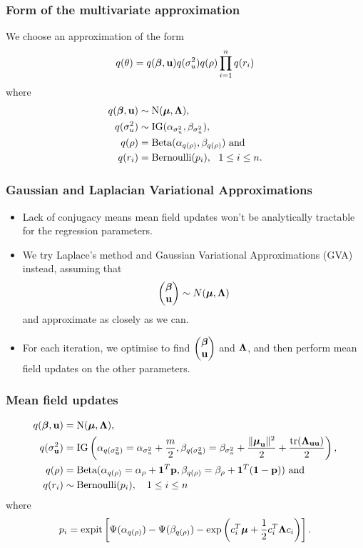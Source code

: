 \documentclass{beamer}
\begin{document}
\begin{frame}
\frametitle{Form of the multivariate approximation}
We choose an approximation of the form
$$
q(\theta) = q({\boldsymbol \beta}, {\bf u}) q(\sigma_u^2) q(\rho) \prod_{i=1}^n q(r_i)
$$
where
\begin{align*}
q({\boldsymbol \beta}, {\bf u}) &\sim \text{N}({\boldsymbol \mu}, {\boldsymbol \Lambda}), \\
q(\sigma_u^2) &\sim \text{IG}(\alpha_{\sigma_u^2}, \beta_{\sigma_u^2}), \\
q(\rho) &= \text{Beta}(\alpha_{q(\rho)}, \beta_{q(\rho)}) \text{ and} \\
q(r_i) &= \text{Bernoulli}(p_i), \ \ 1 \leq i \leq n.
\end{align*}
\end{frame}

\begin{frame}
\frametitle{Gaussian and Laplacian Variational Approximations}
\begin{itemize}
\item Lack of conjugacy means mean field updates won't be analytically tractable for the regression parameters.
\item We try Laplace's method and Gaussian Variational Approximations (GVA) instead, assuming that
$$
\begin{pmatrix}
{\boldsymbol\beta} \\
{\bf u}
\end{pmatrix}
\sim N({\boldsymbol \mu}, {\boldsymbol \Lambda})
$$
and approximate as closely as we can.
\item For each iteration, we optimise to find
$\begin{pmatrix}
{\boldsymbol\beta} \\
{\bf u}
\end{pmatrix}
$ and ${\boldsymbol \Lambda}$,
and then perform mean field updates on the other parameters.
\end{itemize}
\end{frame}

\begin{frame}
\frametitle{Mean field updates}
\begin{align*}
q({\boldsymbol \beta}, {\bf u}) &= \text{N}({\boldsymbol \mu}, {\boldsymbol \Lambda}), \\
q(\sigma_{{\bf u}}^2) &= \text{IG}\left(\alpha_{q(\sigma_{{\bf u}}^2)} = \alpha_{\sigma_u^2} + \frac{m}{2}, \beta_{q(\sigma_{{\bf u}}^2)} = \beta_{\sigma_u^2} + \frac{\|{\boldsymbol \mu}_{\bf u}\|^2}{2} + \frac{\text{tr}({\boldsymbol \Lambda}_{{\bf u}{\bf u}})}{2}\right), \\
q(\rho) &= \text{Beta}(\alpha_{q(\rho)} = \alpha_\rho + {\bf 1}^T{\bf p}, \beta_{q(\rho)} = \beta_\rho + {\bf 1}^T({\bf 1} - {\bf p}))\text{ and} \\
q(r_i) & \sim \text{Bernoulli}{(p_i)}, \ \ \ 1 \leq i \leq n
\end{align*}
where
$$
p_i = \text{expit} \left [\Psi{(\alpha_{q(\rho)})} - \Psi{(\beta_{q(\rho)})} - \exp{\left(c_i^T{\boldsymbol\mu}+ {\frac{1}{2}}c_i^T {\boldsymbol\Lambda}c_i\right)} \right ].
$$
\end{frame}
\end{document}
